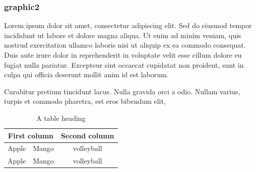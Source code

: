\documentclass{article}
\begin{document}
\subsubsection{graphic2}
Lorem ipsum dolor sit amet, consectetur adipiscing elit. Sed do eiusmod tempor incididunt ut labore et dolore magna aliqua. Ut enim ad minim veniam, quis nostrud exercitation ullamco laboris nisi ut aliquip ex ea commodo consequat. Duis aute irure dolor in reprehenderit in voluptate velit esse cillum dolore eu fugiat nulla pariatur. Excepteur sint occaecat cupidatat non proident, sunt in culpa qui officia deserunt mollit anim id est laborum.

Curabitur pretium tincidunt lacus. Nulla gravida orci a odio. Nullam varius, turpis et commodo pharetra, est eros bibendum elit,

\begin{table}[h]
    \centering
    \caption{A table heading}
    \begin{tabular}{|c|c|c|}
        \hline
        \multicolumn{2}{|c|}{First column} & \multicolumn{1}{|c|}{Second column}                                    \\
        \hline
        Apple                              & Mango                               & \multicolumn{1}{|c|}{volleyball} \\
        \hline
        Apple                              & Mango                               & \multicolumn{1}{|c|}{volleyball} \\
        \hline
    \end{tabular}
\end{table}
\end{document}
